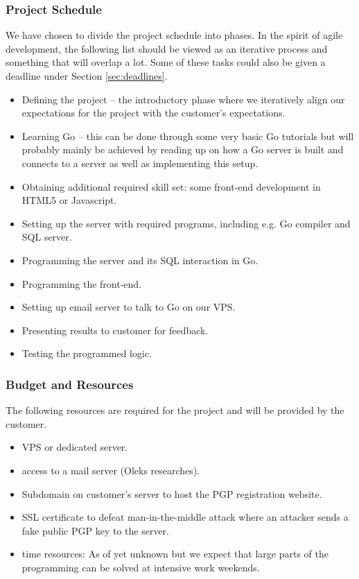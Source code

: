 \documentclass[11pt,a4paper]{article}
\begin{document}
\subsubsection{Project Schedule}
We have chosen to divide the project schedule into phases. In the spirit of agile development, the following list should be viewed as an iterative process and something that will overlap a lot. Some of these tasks could also be given a deadline under Section \ref{sec:deadlines}.
\begin{itemize}
\item Defining the project -- the introductory phase where we iteratively align our expectations for the project with the customer's expectations.
\item Learning Go -- this can be done through some very basic Go tutorials but will probably mainly be achieved by reading up on how a Go server is built and connects to a server as well as implementing this setup.
\item Obtaining additional required skill set: some front-end development in HTML5 or Javascript.
\item Setting up the server with required programs, including e.g. Go compiler and SQL server.
\item Programming the server and its SQL interaction in Go.
\item Programming the front-end.
\item Setting up email server to talk to Go on our VPS.
\item Presenting results to customer for feedback.
\item Testing the programmed logic.
\end{itemize}
\subsubsection{Budget and Resources}
The following resources are required for the project and will be provided by the customer.
\begin{itemize}
\item VPS or dedicated server.
\item access to a mail server (Oleks researches).
\item Subdomain on customer's server to host the PGP registration website.
\item SSL certificate to defeat man-in-the-middle attack where an attacker sends a fake public PGP key to the server.
\item time resources: As of yet unknown but we expect that large parts of the programming can be solved at intensive work weekends.
\end{itemize}
\end{document}
